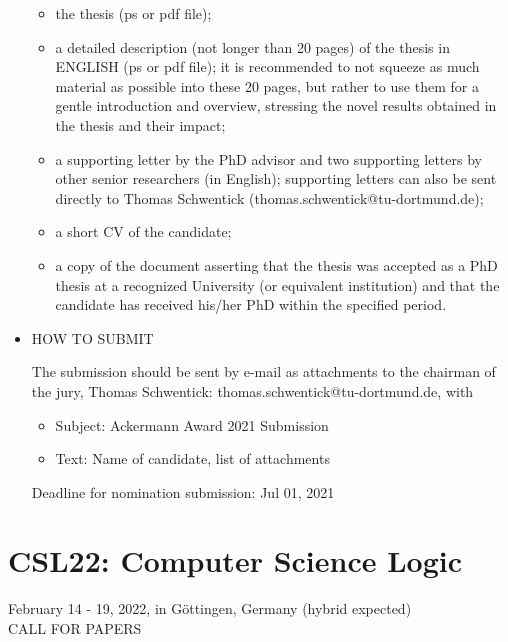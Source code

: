 \documentclass{article}
\begin{document}
\begin{itemize}
\begin{itemize}\item  the thesis (ps or pdf file);
\item  a detailed description (not longer than 20 pages) of the thesis in ENGLISH (ps or pdf file);  it is recommended to not squeeze as much material as possible into these 20 pages, but rather to use them for a gentle introduction and overview, stressing the novel results obtained in the thesis and their impact;
\item  a supporting letter by the PhD advisor and two supporting letters by other senior researchers (in English); supporting letters can also be sent directly to Thomas Schwentick (thomas.schwentick@tu-dortmund.de);
\item  a short CV of the candidate;
\item  a copy of the document asserting that the thesis was accepted as a PhD thesis at a recognized University (or equivalent institution) and that the candidate has received his/her PhD within the specified period.
\end{itemize} 
\item  HOW TO SUBMIT 
 
  The submission should be sent by e-mail as attachments to the chairman of the jury, Thomas Schwentick: thomas.schwentick@tu-dortmund.de, with 
 
\begin{itemize}\item   Subject: Ackermann Award 2021 Submission
\item  Text: Name of candidate, list of attachments
\end{itemize} 
Deadline for nomination submission: Jul 01, 2021 
 
\end{itemize}\section{CSL22: Computer Science Logic}\label{CSL22}   February 14 - 19, 2022, in Göttingen, Germany (hybrid expected)\\ 
CALL FOR PAPERS 
\end{document}
